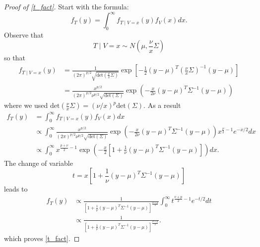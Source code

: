 \documentclass{scrartcl}
\begin{document}
\begin{proof}[Proof of \eqref{t_fact}]
  Start with the formula: 
\begin{equation*}
  f_T(y) = \int_0^{\infty} f_{T \mid V = x}(y) f_V(x) dx. 
\end{equation*}
Observe that
\begin{equation*}
  T \mid V = x \sim N\left(\mu,  \frac{\nu}{x} \Sigma \right)
\end{equation*}
so that
\begin{align*}
f_{T \mid V = x}(y) &= \frac{1}{(2 \pi)^{p/2}
                      \sqrt{\text{det}(\frac{\nu}{x} \Sigma)}} \exp
                      \left[-\frac{1}{2} (y - \mu)^T \left(\frac{\nu}{x}
                      \Sigma\right)^{-1} (y - \mu) \right] \\
  &= \frac{x^{p/2}}{(2 \pi)^{p/2} \nu^{p/2} \sqrt{\text{det}(\Sigma)}}
    \exp \left(-\frac{x}{2\nu} (y - \mu)^T \Sigma^{-1} (y - \mu)
    \right)
\end{align*}
where we used $\text{det}(\frac{\nu}{x} \Sigma) = (\nu/x)^p
\text{det}(\Sigma)$. As a result
\begin{align*}
  f_T(y) &= \int_0^{\infty} f_{T \mid V = x}(y) f_V(x) dx \\
  &\propto \int_0^{\infty} \frac{x^{p/2}}{(2 \pi)^{p/2} \nu^{p/2}
    \sqrt{\text{det}(\Sigma)}} 
    \exp \left(-\frac{x}{2\nu} (y - \mu)^T \Sigma^{-1} (y - \mu)
    \right) x^{\frac{\nu}{2} - 1} e^{-x/2} dx \\
  &\propto \int_0^{\infty} x^{\frac{p+\nu}{2} - 1} \exp
    \left(-\frac{x}{2} \left[1 + \frac{1}{\nu} (y - \mu)^T \Sigma^{-1}
    (y - \mu)\right] 
    \right) dx. 
\end{align*}
The change of variable
\begin{equation*}
  t = x \left[1 + \frac{1}{\nu} (y - \mu)^T \Sigma^{-1} (y - \mu)\right]
\end{equation*}
leads to
\begin{align*}
  f_T(y) &\propto \frac{1}{\left[1 + \frac{1}{\nu} (y - \mu)^T
  \Sigma^{-1} (y - \mu) \right]^{\frac{\nu + p}{2}}} \int_0^{\infty}
           t^{\frac{\nu+p}{2} - 1} e^{-t/2} dt \\
  &\propto \frac{1}{\left[1 + \frac{1}{\nu} (y - \mu)^T
  \Sigma^{-1} (y - \mu) \right]^{\frac{\nu + p}{2}}}. 
\end{align*}
which proves \eqref{t_fact}. 
\end{proof}
\end{document}
